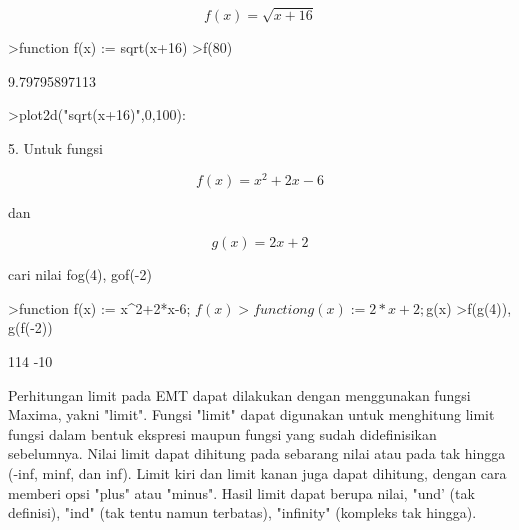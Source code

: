 \documentclass[12pt,arial,letterpaper]{book}
\begin{document}
\begin{eulernootebook}
\begin{eulercomment}
\begin{eulercomment}
\begin{eulernootebook}
\begin{eulercomment}
\begin{eulercomment}
\begin{eulercomment}
\begin{eulercomment}
\begin{eulercomment}
\begin{eulercomment}
\begin{eulernotebook}
\begin{eulercomment}
\begin{eulercomment}
\begin{eulercomment}
\begin{eulercomment}
\begin{eulercomment}
\end{eulercomment}
\begin{eulerformula}
\[
f(x)=\sqrt{x+16}
\]
\end{eulerformula}
\begin{eulerprompt}
>function f(x) := sqrt(x+16)
>f(80)
\end{eulerprompt}
\begin{euleroutput}
  9.79795897113
\end{euleroutput}
\begin{eulerprompt}
>plot2d("sqrt(x+16)",0,100):
\end{eulerprompt}
\begin{eulercomment}
5. Untuk fungsi

\end{eulercomment}
\begin{eulerformula}
\[
f(x)=x^2+2x-6
\]
\end{eulerformula}
\begin{eulercomment}
dan\\
\end{eulercomment}
\begin{eulerformula}
\[
g(x)=2x+2
\]
\end{eulerformula}
\begin{eulercomment}
cari nilai fog(4), gof(-2)
\end{eulercomment}
\begin{eulerprompt}
>function f(x) := x^2+2*x-6; $f(x)
>function g(x) := 2*x+2; $g(x)
>f(g(4)), g(f(-2))
\end{eulerprompt}
\begin{euleroutput}
  114
  -10
\end{euleroutput}
\begin{eulercomment}
Perhitungan limit pada EMT dapat dilakukan dengan menggunakan fungsi
Maxima, yakni "limit". Fungsi "limit" dapat digunakan untuk menghitung
limit fungsi dalam bentuk ekspresi maupun fungsi yang sudah
didefinisikan sebelumnya. Nilai limit dapat dihitung pada sebarang
nilai atau pada tak hingga (-inf, minf, dan inf). Limit kiri dan limit
kanan juga dapat dihitung, dengan cara memberi opsi "plus" atau
"minus". Hasil limit dapat berupa nilai, "und’ (tak definisi), "ind"
(tak tentu namun terbatas), "infinity" (kompleks tak hingga).


\end{eulercomment}
\end{eulercomment}
\end{eulercomment}
\end{eulercomment}
\end{eulercomment}
\end{eulernotebook}
\end{eulercomment}
\end{eulercomment}
\end{eulercomment}
\end{eulercomment}
\end{eulercomment}
\end{eulercomment}
\end{eulernootebook}
\end{eulercomment}
\end{eulercomment}
\end{eulernootebook}
\end{document}
